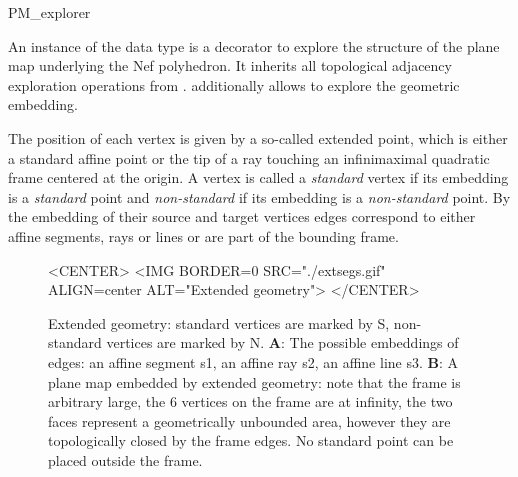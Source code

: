 
\begin{ccRefClass}{PM_explorer}


\ccDefinition

An instance  of the data type  is a decorator
to explore the structure of the plane map underlying the Nef
polyhedron. It inherits all topological adjacency exploration
operations from . 
additionally allows to explore the geometric embedding.

The position of each vertex is given by a so-called extended point, which is
either a standard affine point or the tip of a ray touching an
infinimaximal quadratic frame centered at the origin. A vertex  is
called a \emph{standard} vertex if its embedding is a \emph{standard}
point and \emph{non-standard} if its embedding is a
\emph{non-standard} point. By the embedding of their source and target
vertices edges correspond to either affine segments, rays or lines
or are part of the bounding frame.

\begin{figure}[htbp]
\begin{ccTexOnly}
\begin{center}
\end{center}
\end{ccTexOnly}
\caption{Extended geometry: standard vertices are marked
by S, non-standard vertices are marked by N. \textbf{A}: The possible
embeddings of edges: an affine segment s1, an affine ray s2, an affine
line s3. \textbf{B}: A plane map embedded by extended geometry: note
that the frame is arbitrary large, the 6 vertices on the frame are at
infinity, the two faces represent a geometrically unbounded area,
however they are topologically closed by the frame edges. No standard
point can be placed outside the frame.}
\label{extsegs}    
\begin{ccHtmlOnly}
<CENTER>
<IMG BORDER=0 SRC="./extsegs.gif" ALIGN=center
ALT="Extended geometry">
</CENTER>
\end{ccHtmlOnly}
\end{figure}


\end{ccRefClass}

